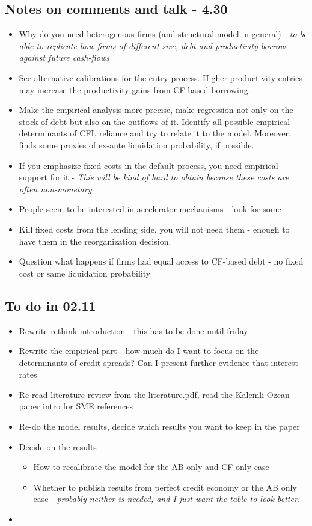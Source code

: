 \documentclass[12pt]{article}
\begin{document}
\subsection*{Notes on comments and talk - 4.30}
\begin{itemize} \setlength\itemsep{0em} \small
    \item Why do you need heterogenous firms (and structural model in general) - \textit{to be able to replicate how firms of different size, debt and productivity borrow against future cash-flows}
    \item See alternative calibrations for the entry process. Higher productivity entries may increase the productivity gains from CF-based borrowing. 
    \item Make the empirical analysis more precise, make regression not only on the stock of debt but also on the outflows of it. Identify all possible empirical determinants of CFL reliance and try to relate it to the model. Moreover, finds some proxies of ex-ante liquidation probability, if possible. 
    \item If you emphasize fixed costs in the default process, you need empirical support for it - \textit{This will be kind of hard to obtain because these costs are often non-monetary}
    \item People seem to be interested in accelerator mechanisms - look for some 
    \item Kill fixed costs from the lending side, you will not need them - enough to have them in the reorganization decision. 
    \item Question what happens if firms had equal access to CF-based debt - no fixed cost or same liquidation probability
\end{itemize} \normalsize


\subsection*{To do in 02.11}
\begin{itemize} \setlength\itemsep{0em} \small
    \item Rewrite-rethink introduction - this has to be done until friday
    \item Rewrite the empirical part - how much do I want to focus on the determinants of credit spreads? Can I present further evidence that interest rates 
    \item Re-read literature review from the literature.pdf, read the Kalemli-Ozcan paper intro for SME references
    \item Re-do the model results, decide which results you want to keep in the paper
    \item Decide on the results
    \begin{itemize}
        \item How to recalibrate the model for the AB only and CF only case
        \item Whether to publish results from perfect credit economy or the AB only case - \textit{probably neither is needed, and I just want the table to look better.}
    \end{itemize}
    \item 
\end{itemize} \normalsize
\end{document}
